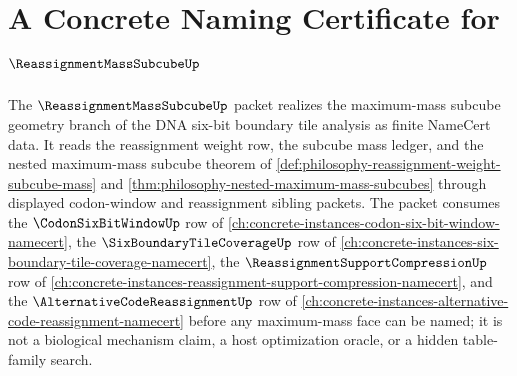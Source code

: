 \chapter{A Concrete Naming Certificate for $\ReassignmentMassSubcubeUp$}
\label{ch:concrete-instances-reassignment-mass-subcube-namecert}

The $\ReassignmentMassSubcubeUp$ packet realizes the maximum-mass subcube geometry branch of the DNA six-bit boundary tile analysis as finite NameCert data. It reads the reassignment weight row, the subcube mass ledger, and the nested maximum-mass subcube theorem of \autoref{def:philosophy-reassignment-weight-subcube-mass} and \autoref{thm:philosophy-nested-maximum-mass-subcubes} through displayed codon-window and reassignment sibling packets. The packet consumes the $\CodonSixBitWindowUp$ row of \autoref{ch:concrete-instances-codon-six-bit-window-namecert}, the $\SixBoundaryTileCoverageUp$ row of \autoref{ch:concrete-instances-six-boundary-tile-coverage-namecert}, the $\ReassignmentSupportCompressionUp$ row of \autoref{ch:concrete-instances-reassignment-support-compression-namecert}, and the $\AlternativeCodeReassignmentUp$ row of \autoref{ch:concrete-instances-alternative-code-reassignment-namecert} before any maximum-mass face can be named; it is not a biological mechanism claim, a host optimization oracle, or a hidden table-family search.

